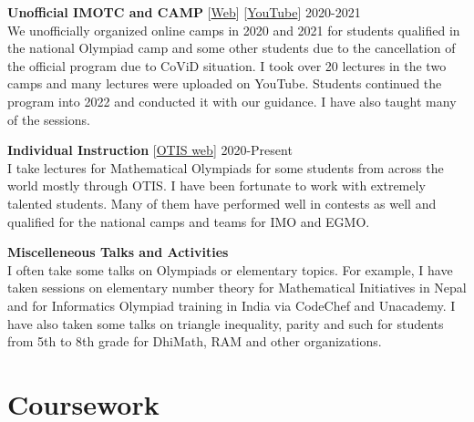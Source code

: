 \documentclass[margin,line, 10pt]{res}
\begin{document}
\begin{resume}
{\bf Unofficial IMOTC and CAMP}{\hspace{1em} [\href{https://sites.google.com/view/campamp/home}{Web}]\hspace{0.4em} [\href{https://www.youtube.com/@campforadvancedmathematica4861}{YouTube}]} \hfill 2020-2021 \\
We unofficially organized online camps in 2020 and 2021 for students qualified in the national Olympiad camp and some other students due to the cancellation of the official program due to CoViD situation. I took over 20 lectures in the two camps and many lectures were uploaded on YouTube. Students continued the program into 2022 and conducted it with our guidance. I have also taught many of the sessions.

{\bf Individual Instruction} \hspace{1em} [\href{https://web.evanchen.cc/otis.html}{OTIS web}]  \hfill 2020-Present\\
I take lectures for Mathematical Olympiads for some students from across the world mostly through OTIS. I have been fortunate to work with extremely talented students. Many of them have performed well in contests as well and qualified for the national camps and teams for IMO and EGMO.

{\bf Miscelleneous Talks and Activities}\\
I often take some talks on Olympiads or elementary topics. For example, I have taken sessions on elementary number theory for Mathematical Initiatives in Nepal and for Informatics Olympiad training in India via CodeChef and Unacademy. I have also taken some talks on triangle inequality, parity and such for students from 5th to 8th grade for DhiMath, RAM and other organizations. 


\section{\sc Coursework}


\end{resume}
\end{document}

